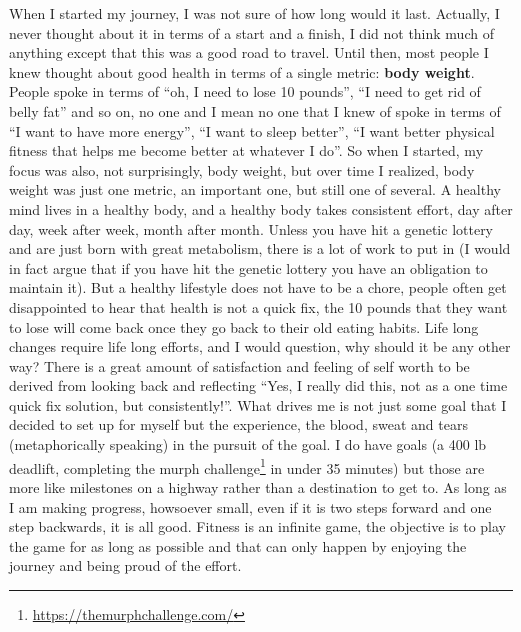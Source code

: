 \documentclass[
  oneside]{book}
\DeclareRobustCommand{\href}[2]{#2\footnote{\url{#1}}}
\begin{document}
When I started my journey, I was not sure of how long would it last. Actually, I never thought about it in terms of a start and a finish, I did not think much of anything except that this was a good road to travel. Until then, most people I knew thought about good health in terms of a single metric: \textbf{body weight}. People spoke in terms of ``oh, I need to lose 10 pounds'', ``I need to get rid of belly fat'' and so on, no one and I mean no one that I knew of spoke in terms of ``I want to have more energy'', ``I want to sleep better'', ``I want better physical fitness that helps me become better at whatever I do''. So when I started, my focus was also, not surprisingly, body weight, but over time I realized, body weight was just one metric, an important one, but still one of several. A healthy mind lives in a healthy body, and a healthy body takes consistent effort, day after day, week after week, month after month. Unless you have hit a genetic lottery and are just born with great metabolism, there is a lot of work to put in (I would in fact argue that if you have hit the genetic lottery you have an obligation to maintain it). But a healthy lifestyle does not have to be a chore, people often get disappointed to hear that health is not a quick fix, the 10 pounds that they want to lose will come back once they go back to their old eating habits. Life long changes require life long efforts, and I would question, why should it be any other way? There is a great amount of satisfaction and feeling of self worth to be derived from looking back and reflecting ``Yes, I really did this, not as a one time quick fix solution, but consistently!''. What drives me is not just some goal that I decided to set up for myself but the experience, the blood, sweat and tears (metaphorically speaking) in the pursuit of the goal. I do have goals (a 400 lb deadlift, completing the \href{https://themurphchallenge.com/}{murph challenge} in under 35 minutes) but those are more like milestones on a highway rather than a destination to get to. As long as I am making progress, howsoever small, even if it is two steps forward and one step backwards, it is all good. Fitness is an infinite game, the objective is to play the game for as long as possible and that can only happen by enjoying the journey and being proud of the effort.
\end{document}
